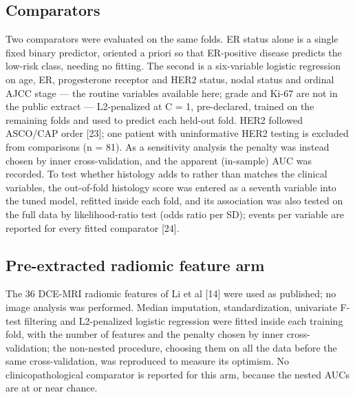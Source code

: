\documentclass[11pt,a4paper]{article}
\begin{document}
\subsection{Comparators}
Two comparators were evaluated on the same folds. ER status alone is a single fixed binary predictor, oriented a priori so that ER-positive disease predicts the low-risk class, needing no fitting. The second is a six-variable logistic regression on age, ER, progesterone receptor and HER2 status, nodal status and ordinal AJCC stage --- the routine variables available here; grade and Ki-67 are not in the public extract --- L2-penalized at C = 1, pre-declared, trained on the remaining folds and used to predict each held-out fold. HER2 followed ASCO/CAP order [23]; one patient with uninformative HER2 testing is excluded from comparisons (n = 81). As a sensitivity analysis the penalty was instead chosen by inner cross-validation, and the apparent (in-sample) AUC was recorded. To test whether histology adds to rather than matches the clinical variables, the out-of-fold histology score was entered as a seventh variable into the tuned model, refitted inside each fold, and its association was also tested on the full data by likelihood-ratio test (odds ratio per SD); events per variable are reported for every fitted comparator [24].

\subsection{Pre-extracted radiomic feature arm}
The 36 DCE-MRI radiomic features of Li et al [14] were used as published; no image analysis was performed. Median imputation, standardization, univariate F-test filtering and L2-penalized logistic regression were fitted inside each training fold, with the number of features and the penalty chosen by inner cross-validation; the non-nested procedure, choosing them on all the data before the same cross-validation, was reproduced to measure its optimism. No clinicopathological comparator is reported for this arm, because the nested AUCs are at or near chance.
\end{document}
